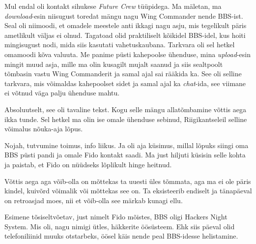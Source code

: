 Mul endal oli kontakt sihukese \emph{Future Crew} tüüpidega. Ma mäletan, ma \emph{download}-esin niisugust 
toredat mängu nagu Wing Commander nende BBS-ist. 
Seal oli niimoodi, et omadele meestele anti ikkagi nagu asju, mis tegelikult 
päris ametlikult väljas ei olnud. Tagatoad olid praktiliselt kõikidel BBS-idel, 
kus hoiti mingisugust nodi, mida siis kasutati vahetuskaubana. Tarkvara oli sel 
hetkel omamoodi kõva valuuta. Me panime püsti kahepoolse ühenduse, mina 
\emph{upload}-esin mingit muud asja, mille ma olin kusagilt mujalt saanud ja 
siis  sealtpoolt tõmbasin vastu Wing Commanderit ja samal ajal sai rääkida ka. 
See oli selline tarkvara, mis võimaldas kahepoolset sidet ja samal ajal ka 
\emph{chat}-ida, see viimane ei võtnud väga palju ühenduse mahtu.


Absoluutselt, see oli tavaline tekst. Kogu selle mängu allatõmbamine võttis 
aega ikka tunde. Sel hetkel ma olin ise omale ühenduse sebinud, Riigikantseleil 
selline võimalus nõuka-aja lõpus. 

Nojah, tutvumine toimus, info liikus. Ja oli aja küsimus, millal lõpuks siingi  
oma BBS püsti pandi ja omale Fido kontakt saadi. Ma just hiljuti küsisin selle 
kohta ja paistab, et Fido on nüüdseks lõplikult hinge heitnud.


Võttis aega aga võib-olla on mõttekas ta uuesti üles tõmmata, aga ma ei ole 
päris kindel, kuivõrd võimalik või mõttekas see on. Ta eksisteerib endiselt ja 
tänapäeval on retroasjad moes, nii et võib-olla see märkab kunagi ellu.
                 

Esimene tõsiseltvõetav, just nimelt Fido mõistes, BBS oligi Hackers Night 
System. Mis oli, nagu 
nimigi ütles, häkkerite öösüsteem. Ehk siis päeval olid telefoniliinid muuks 
otstarbeks, öösel käis nende peal BBS-idesse helistamine. 


